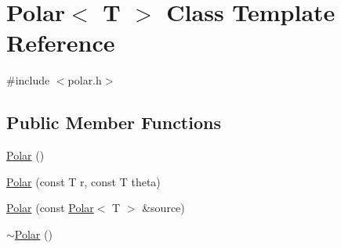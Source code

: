 \hypertarget{classPolar}{}\section{Polar$<$ T $>$ Class Template Reference}
\label{classPolar}


{\ttfamily \#include $<$polar.\+h$>$}

\subsection*{Public Member Functions}
\begin{DoxyCompactItemize}
\item 
\hyperlink{classPolar_ac33c960b4ee3c406cc68f12998993764}{Polar} ()
\item 
\hyperlink{classPolar_a095329664869903d091679bbebb9c7ca}{Polar} (const T r, const T theta)
\item 
\hyperlink{classPolar_ad6f9e2e01b5fa1c06de64fafbc2129dc}{Polar} (const \hyperlink{classPolar}{Polar}$<$ T $>$ \&source)
\item 
\hyperlink{classPolar_a5d8bdb7a0722f6e4e93189a395a2f117}{$\sim$\+Polar} ()\hypertarget{classPolar_a5d8bdb7a0722f6e4e93189a395a2f117}{}\label{classPolar_a5d8bdb7a0722f6e4e93189a395a2f117}


\end{DoxyCompactItemize}
